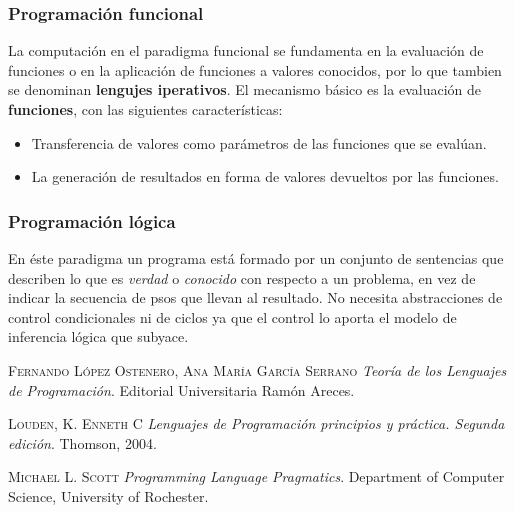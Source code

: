 \documentclass{article}
\begin{document}
\subsubsection{Programaci\'on funcional \cite{lengprog}}

La computaci\'on en el paradigma funcional se fundamenta en la evaluaci\'on de funciones o en la aplicaci\'on de funciones a valores conocidos, por lo que tambien se denominan \textbf{lengujes iperativos}. El mecanismo b\'asico es la evaluaci\'on de \textbf{funciones}, con las siguientes caracter\'isticas:

\begin{itemize}
\item Transferencia de valores como par\'ametros de las funciones que se eval\'uan.
\item La generaci\'on de resultados en forma de valores devueltos por las funciones.
\end{itemize}

\subsubsection{Programaci\'on l\'ogica \cite{lengprog}}

En \'este paradigma un programa est\'a formado por un conjunto de sentencias que describen lo que es \textit{verdad} o \textit{conocido} con respecto a un problema, en vez de indicar la secuencia de psos que llevan al resultado. No necesita abstracciones de control condicionales ni de ciclos ya que el control lo aporta el modelo de inferencia l\'ogica que subyace.


\newpage
\begin{thebibliography}{9}
	\textsc{Fernando L\'opez Ostenero, Ana Mar\'ia Garc\'ia Serrano}
	\textit{Teor\'ia de los Lenguajes de Programaci\'on}. 
	Editorial Universitaria Ram\'on Areces.

	\textsc{Louden, K. Enneth C}
	\textit{Lenguajes de Programaci\'on principios y pr\'actica. Segunda edici\'on}. 
	Thomson, 2004.
	
	\textsc{Michael L. Scott} 
	\textit{Programming Language Pragmatics}. 
	Department of Computer Science, University of Rochester.
\end{thebibliography}
\end{document}
